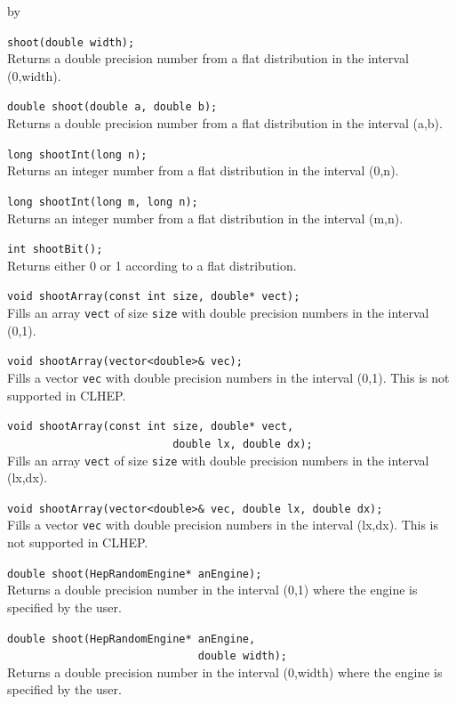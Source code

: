 \documentclass[twoside]{article}
\newcommand{\comp}[1]{\texttt{#1}}%
\newcommand{\entrylabel}[1]{\mbox{\textbf{{#1}}}\hfil}%
\newenvironment{entry}
{\begin{list}{}%
    {\renewcommand{\makelabel}{\entrylabel}%
     \setlength{\labelwidth}{90pt}%
     \setlength{\leftmargin}{\labelwidth}
     \advance\leftmargin by \labelsep%
      }%
    }%
  {\end{list}}
\newcommand{\Entrylabel}[1]%
{\raisebox{0pt}[1ex][0pt]{\makebox[\labelwidth][l]%
    {\parbox[t]{\labelwidth}{\hspace{0pt}\textbf{{#1}}}}}}
\newenvironment{Entry}%
{\renewcommand{\entrylabel}{\Entrylabel}\begin{entry}}%
  {\end{entry}}
\begin{document}
\begin{description}
\begin{Entry}
    \verb+shoot(double width);+\\
    Returns a double precision number from a flat distribution
    in the interval (0,width).
    
    \verb+double shoot(double a, double b);+\\
    Returns a double precision number from a flat distribution
    in the interval (a,b).

    \verb+long shootInt(long n);+\\
    Returns an integer number from a flat distribution
    in the interval (0,n).
    
    \verb+long shootInt(long m, long n);+\\
    Returns an integer number from a flat distribution
    in the interval (m,n).
    
    \verb+int shootBit();+\\
    Returns either 0 or 1 according to a flat distribution.
    
    \verb+void shootArray(const int size, double* vect);+\\
    Fills an array \comp{vect} of size \comp{size} with double
    precision numbers in the interval (0,1).

    \verb+void shootArray(vector<double>& vec);+\\
    Fills a vector \comp{vec} with double
    precision numbers in the interval (0,1).
    This is not supported in CLHEP.

    \verb+void shootArray(const int size, double* vect,+\\
    \verb+                          double lx, double dx);+\\
    Fills an array \comp{vect} of size \comp{size} with double
    precision numbers in the interval (lx,dx).

    \verb+void shootArray(vector<double>& vec, double lx, double dx);+\\
    Fills a vector \comp{vec} with double
    precision numbers in the interval (lx,dx).
    This is not supported in CLHEP.
    
    \verb+double shoot(HepRandomEngine* anEngine);+\\
    Returns a double precision number in the interval (0,1)
    where the engine is specified by the user.
    
    \verb+double shoot(HepRandomEngine* anEngine,+\\
    \verb+                              double width);+\\
    Returns a double precision number in the interval (0,width)
    where the engine is specified by the user.
    

\end{Entry}
\end{description}
\end{document}

